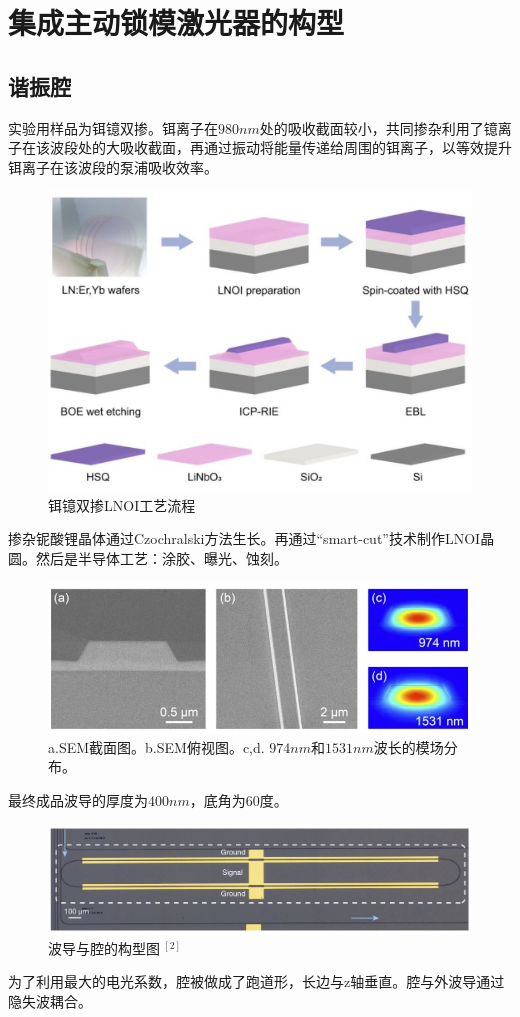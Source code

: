 \chapter{集成主动锁模激光器的构型}
\label{sec:related}

\fontsize{12bp}{14.4pt}

\section{谐振腔}
实验用样品为铒镱双掺。铒离子在$980nm$处的吸收截面较小，共同掺杂利用了镱离子在该波段处的大吸收截面，再通过振动将能量传递给周围的铒离子，以等效提升铒离子在该波段的泵浦吸收效率。\\
\begin{figure}[htbp]
    \centering
    \includegraphics[width=0.7\linewidth]{figure/fig_1.png}
    \caption{铒镱双掺LNOI工艺流程}
    \label{fig:1}
\end{figure}
掺杂铌酸锂晶体通过Czochralski方法生长。再通过“smart-cut”技术制作LNOI晶圆。然后是半导体工艺：涂胶、曝光、蚀刻。
\begin{figure}[htbp]
    \centering
    \includegraphics[width=0.7\linewidth]{figure/fig_7.png}
    \caption{a.SEM截面图。b.SEM俯视图。c,d. $974nm$和$1531nm$波长的模场分布。}
    \label{fig:enter-label}
\end{figure}
最终成品波导的厚度为$400nm$，底角为$60$度。
\begin{figure}[htbp]
    \centering
    \includegraphics[width=0.95\linewidth]{figure/fig_8.png}
    \caption{波导与腔的构型图$~^{[2]}$}
    \label{fig:enter-label}
\end{figure}
为了利用最大的电光系数，腔被做成了跑道形，长边与z轴垂直。腔与外波导通过隐失波耦合。
